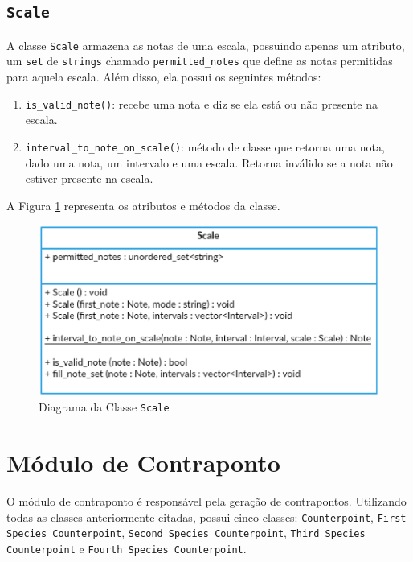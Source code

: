     \subsection[\texttt{Scale}]{\texttt{Scale}}

    A classe \texttt{Scale} armazena as notas de uma escala, possuindo apenas um atributo, um \texttt{set} de \texttt{strings} chamado \texttt{permitted\_notes} que define as notas permitidas para aquela escala. Além disso, ela possui os seguintes métodos:

    \begin{enumerate}
      \item \texttt{is\_valid\_note()}: recebe uma nota e diz se ela está ou não presente na escala.
      \item \texttt{interval\_to\_note\_on\_scale()}: método de classe que retorna uma nota, dado uma nota, um intervalo e uma escala. Retorna inválido se a nota não estiver presente na escala.
    \end{enumerate}


    A Figura \ref{scaleclass} representa os atributos e métodos da classe.

    \begin{figure}[htb]
      \centering
      \includegraphics[scale=0.7]{figuras/scaleclass.eps}
      \caption{Diagrama da Classe \texttt{Scale}}
      \label{scaleclass}
    \end{figure}

  \section[Módulo de Contraponto]{Módulo de Contraponto}

    O módulo de contraponto é responsável pela geração de contrapontos. Utilizando todas as classes anteriormente citadas, possui cinco classes: \texttt{Counterpoint}, \texttt{First Species Counterpoint}, \texttt{Second Species Counterpoint}, \texttt{Third Species Counterpoint} e \texttt{Fourth Species Counterpoint}.

